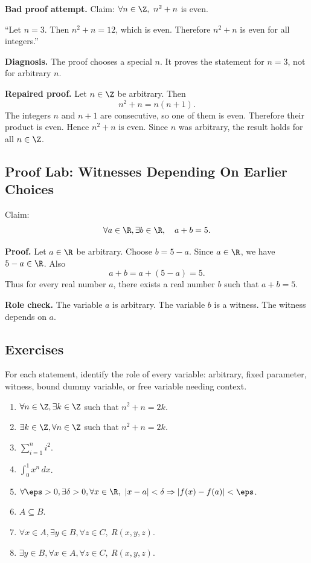 \begin{labbox}
\textbf{Bad proof attempt.}
Claim: $\forall n\in\Z,\ n^2+n$ is even.

``Let $n=3$. Then $n^2+n=12$, which is even. Therefore $n^2+n$ is even for all integers.''

\textbf{Diagnosis.}
The proof chooses a special $n$. It proves the statement for $n=3$, not for arbitrary $n$.

\textbf{Repaired proof.}
Let $n\in\Z$ be arbitrary. Then
\[
n^2+n=n(n+1).
\]
The integers $n$ and $n+1$ are consecutive, so one of them is even. Therefore their product is even. Hence $n^2+n$ is even. Since $n$ was arbitrary, the result holds for all $n\in\Z$.
\end{labbox}

\subsection{Proof Lab: Witnesses Depending On Earlier Choices}

\begin{labbox}
Claim:
\[
\forall a\in\R,\exists b\in\R,\quad a+b=5.
\]

\textbf{Proof.}
Let $a\in\R$ be arbitrary. Choose $b=5-a$. Since $a\in\R$, we have $5-a\in\R$. Also
\[
a+b=a+(5-a)=5.
\]
Thus for every real number $a$, there exists a real number $b$ such that $a+b=5$.

\textbf{Role check.}
The variable $a$ is arbitrary. The variable $b$ is a witness. The witness depends on $a$.
\end{labbox}

\subsection{Exercises}

For each statement, identify the role of every variable: arbitrary, fixed parameter, witness, bound dummy variable, or free variable needing context.

\begin{enumerate}
\item $\forall n\in\Z,\exists k\in\Z$ such that $n^2+n=2k$.
\item $\exists k\in\Z,\forall n\in\Z$ such that $n^2+n=2k$.
\item $\sum_{i=1}^{n}i^2$.
\item $\int_0^1 x^n\,dx$.
\item $\forall \eps>0,\exists \delta>0,\forall x\in\R,\ |x-a|<\delta\Rightarrow |f(x)-f(a)|<\eps$.
\item $A\subseteq B$.
\item $\forall x\in A,\exists y\in B,\forall z\in C,\ R(x,y,z)$.
\item $\exists y\in B,\forall x\in A,\forall z\in C,\ R(x,y,z)$.
\end{enumerate}

